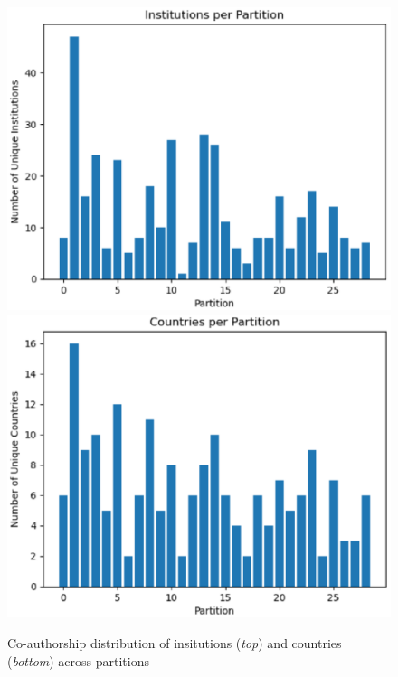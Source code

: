 \documentclass[a4paper, review, endfloat, authoryear]{elsarticle}
\begin{document}
	\begin{figure}[htbp]
		\centering
		\includegraphics[scale=0.8]{pics/coauthorship_inst_per_partition.eps}
		\includegraphics[scale=0.8]{pics/coauthorship_country_per_partition.eps}
		\caption{Co-authorship distribution of insitutions (\textit{top}) and countries (\textit{bottom}) across partitions}\label{fig:fig5}
	\end{figure}
\end{document}
